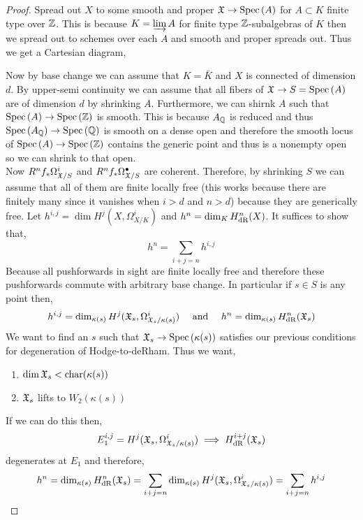 \documentclass[12pt]{article}
\begin{document}
\begin{proof}
Spread out $X$ to some smooth and proper $\mathfrak{X} \to \mathrm{Spec}\left( A \right)$ for $A \subset K$ finite type over $\mathbb{Z}$. This is because $K = \varinjlim A$ for finite type $\mathbb{Z}$-subalgebras of $K$ then we spread out to schemes over each $A$ and smooth and proper spreads out. Thus we get a Cartesian diagram,
\begin{center}
\end{center}
Now by base change we can assume that $K = \bar{K}$ and $X$ is connected of dimension $d$. By upper-semi continuity we can assume that all fibers of $\mathfrak{X} \to S = \mathrm{Spec}\left( A \right)$ are of dimension $d$ by shrinking $A$. Furthermore, we can shirnk $A$ such that $\mathrm{Spec}\left( A \right) \to \mathrm{Spec}\left( \mathbb{Z} \right)$ is smooth. This is because $A_{\mathbb{Q}}$ is reduced and thus $\mathrm{Spec}\left( A_{\mathbb{Q}} \right) \to \mathrm{Spec}\left( \mathbb{Q} \right)$ is smooth on a dense open and therefore the smooth locus of $\mathrm{Spec}\left( A \right) \to \mathrm{Spec}\left( \mathbb{Z} \right)$ contains the generic point and thus is a nonempty open so we can shrink to that open.
\bigskip\\
Now $R^n f_* \Omega^i_{\mathfrak{X} / S}$ and $R^n f_* \Omega^\bullet_{\mathfrak{X}/S}$ are coherent. Therefore, by shrinking $S$ we can assume that all of them are finite locally free (this works because there are finitely many since it vanishes when $i > d$ and $n > d$) because they are generically free. Let $h^{i,j} = \dim H^j(X, \Omega^i_{X/K})$ and $h^n = \dim_K H^n_{\mathrm{dR}}(X)$. It suffices to show that,
\[ h^n = \sum_{i + j = n} h^{i,j} \]
Because all pushforwards in sight are finite locally free and therefore these pushforwards commute with arbitrary base change. In particular if $s \in S$ is any point then,
\[ h^{i,j} = \dim_{\kappa(s)} H^j(\mathfrak{X}_s, \Omega^i_{\mathfrak{X}_s / \kappa(s)}) \quad \text{ and } \quad h^n = \dim_{\kappa(s)} H^n_{\mathrm{dR}}(\mathfrak{X}_s) \]
We want to find an $s$ such that $\mathfrak{X}_s \to \mathrm{Spec}\left( \kappa(s) \right)$ satisfies our previous conditions for degeneration of Hodge-to-deRham. Thus we want,
\begin{enumerate}
\item $\dim{\mathfrak{X}_s} < \mathrm{char}(\kappa(s))$
\item $\mathfrak{X}_s$ lifts to $W_2(\kappa(s))$
\end{enumerate}
If we can do this then,
\[ E^{i,j}_1 = H^j(\mathfrak{X}_s, \Omega^i_{\mathfrak{X}_s/\kappa(s)}) \implies H^{i+j}_{\mathrm{dR}}(\mathfrak{X}_s) \]
degenerates at $E_1$ and therefore,
\[ h^n = \dim_{\kappa(s)} H^n_{\mathrm{dR}}(\mathfrak{X}_s) = \sum_{i+j = n} \dim_{\kappa(s)} H^j(\mathfrak{X}_s, \Omega^i_{\mathfrak{X}_s / \kappa(s)}) = \sum_{i + j = n} h^{i,j} \]

\end{proof}
\end{document}
